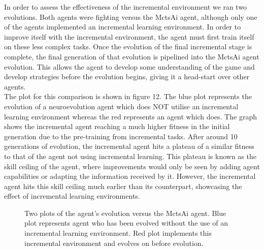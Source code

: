 \documentclass[12pt,a4paper]{article}
\begin{document}
In order to assess the effectiveness of the incremental environment we ran two evolutions. Both agents were fighting versus the MctsAi agent, although only one of the agents implemented an incremental learning environment. In order to improve itself with the incremental environment, the agent must first train itself on these less complex tasks. Once the evolution of the final incremental stage is complete, the final generation of that evolution is pipelined into the MctsAi agent evolution. This allows the agent to develop some understanding of the game and develop strategies before the evolution begins, giving it a head-start over other agents.\\
\newpage
The plot for this comparison is shown in figure 12. The blue plot represents the evolution of a neuroevolution agent which does NOT utilise an incremental learning environment whereas the red represents an agent which does. The graph shows the incremental agent reaching a much higher fitness in the initial generation due to the pre-training from incremental tasks. After around 10 generations of evolution, the incremental agent hits a plateau of a similar fitness to that of the agent not using incremental learning. This plateau is known as the skill ceiling of the agent, where improvements would only be seen by adding agent capabilities or adapting the information received by it. However, the incremental agent hits this skill ceiling much earlier than its counterpart, showcasing the effect of incremental learning environments.\\

\begin{figure}[h]
\begin{center}
\end{center}
\caption{Two plots of the agent's evolution versus the MctsAi agent. Blue plot represents agent who has been evolved without the use of an incremental learning environment. Red plot implements this incremental environment and evolves on before evolution.}
\end{figure}
\end{document}
